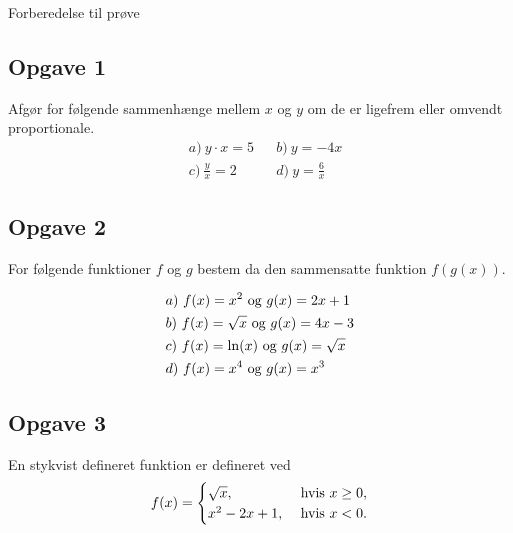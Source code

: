 \documentclass[12pt]{article}
\begin{document}



\begin{center}
\Huge
Forberedelse til prøve
\end{center}

\subsection*{Opgave 1}

Afgør for følgende sammenhænge mellem $x$ og $y$ om de er ligefrem eller omvendt proportionale.
\begin{align*}
	&a) \ y\cdot x = 5 &&b) \  y = -4x   \\
	&c) \ \frac{y}{x} = 2  &&d) \ y = \frac{6}{x}   
\end{align*}


\subsection*{Opgave 2}

For følgende funktioner $f$ og $g$ bestem da den sammensatte funktion $f(g(x))$. 

\begin{align*}
	&a) \  f(x) = x^2 \textnormal{ og } g(x) = 2x+1\\
	&b) \  f(x) = \sqrt{x} \textnormal{ og } g(x) = 4x-3\\
	&c) \  f(x) = \ln(x) \textnormal{ og } g(x) = \sqrt{x}\\
	&d) \  f(x) = x^4 \textnormal{ og } g(x) = x^3\\
\end{align*}

\subsection*{Opgave 3}

En stykvist defineret funktion er defineret ved
\begin{align*}
	f(x) = 
	\begin{cases}
		\sqrt{x}, &\textnormal{ hvis } x \geq 0,\\
		x^2-2x+1, &\textnormal{ hvis } x < 0.		
	\end{cases}
\end{align*}
\end{document}
